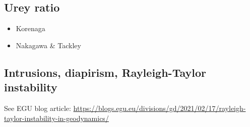 \subsection{Urey ratio}

\begin{scriptsize}
\begin{itemize}
\item[\twothousandeight] Korenaga \cite{kore08}
\item[\twothousandtwelve] Nakagawa \& Tackley \cite{nata12}
\end{itemize}
\end{scriptsize}

\subsection{Intrusions, diapirism, Rayleigh-Taylor instability}

See EGU blog article: 
\url{https://blogs.egu.eu/divisions/gd/2021/02/17/rayleigh-taylor-instability-in-geodynamics/}

